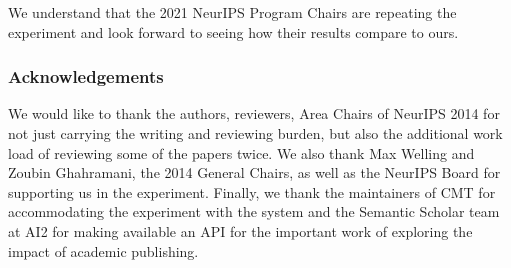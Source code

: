 \documentclass[twoside]{article}
\begin{document}
We understand that the 2021 NeurIPS Program Chairs are repeating the experiment and look forward to seeing how their results compare to ours.

\subsubsection*{Acknowledgements}

We would like to thank the authors, reviewers, Area Chairs of NeurIPS 2014 for not just carrying the writing and reviewing burden, but also the additional work load of reviewing some of the papers twice. We also thank Max Welling and Zoubin Ghahramani, the 2014 General Chairs, as well as the NeurIPS Board for supporting us in the experiment. Finally, we thank the maintainers of CMT for accommodating the experiment with the system and the Semantic Scholar team at AI2 for making available an API for the important work of exploring the impact of academic publishing.



\appendix

\end{document}
